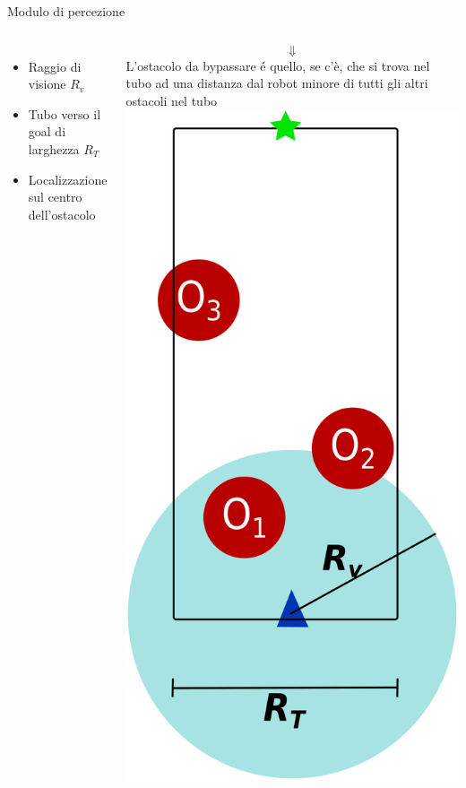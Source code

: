 \documentclass[handout]{beamer}
\begin{document}
\begin{frame}{Modulo di percezione}
\begin{columns}
	\centering
	\begin{itemize}
	\item Raggio di visione $R_v$
	\item Tubo verso il goal di larghezza $R_T$
	\item Localizzazione sul centro dell'ostacolo
	\end{itemize}
	\[\Downarrow\]
L'ostacolo da bypassare é quello, se c'è, che si trova nel tubo ad una distanza dal robot minore di tutti gli altri ostacoli nel tubo
	\centering
	\includegraphics[scale=1]{tubo.png}
\end{columns}
\end{frame}
\end{document}
